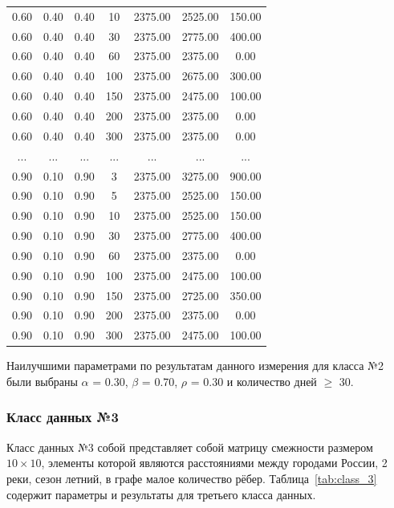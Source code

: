 \begin{table}[H]
\begin{tabular}{|c|c|c|c|c|c|c|}
  0.60 &   0.40 &   0.40 &     10 &    2375.00 &    2525.00 &     150.00  \\
  0.60 &   0.40 &   0.40 &     30 &    2375.00 &    2775.00 &     400.00  \\
  0.60 &   0.40 &   0.40 &     60 &    2375.00 &    2375.00 &       0.00  \\
  0.60 &   0.40 &   0.40 &    100 &    2375.00 &    2675.00 &     300.00  \\
  0.60 &   0.40 &   0.40 &    150 &    2375.00 &    2475.00 &     100.00  \\
  0.60 &   0.40 &   0.40 &    200 &    2375.00 &    2375.00 &       0.00  \\
  0.60 &   0.40 &   0.40 &    300 &    2375.00 &    2375.00 &       0.00  \\
    ... &   ... &   ... &    ... &    ... &    ... &      ...  \\
  0.90 &   0.10 &   0.90 &      3 &    2375.00 &    3275.00 &     900.00  \\
  0.90 &   0.10 &   0.90 &      5 &    2375.00 &    2525.00 &     150.00  \\
  0.90 &   0.10 &   0.90 &     10 &    2375.00 &    2525.00 &     150.00  \\
  0.90 &   0.10 &   0.90 &     30 &    2375.00 &    2775.00 &     400.00  \\
  0.90 &   0.10 &   0.90 &     60 &    2375.00 &    2375.00 &       0.00  \\
  0.90 &   0.10 &   0.90 &    100 &    2375.00 &    2475.00 &     100.00  \\
  0.90 &   0.10 &   0.90 &    150 &    2375.00 &    2725.00 &     350.00  \\
  0.90 &   0.10 &   0.90 &    200 &    2375.00 &    2375.00 &       0.00  \\
  0.90 &   0.10 &   0.90 &    300 &    2375.00 &    2475.00 &     100.00  \\
  \hline
    \end{tabular}
\end{table}

Наилучшими параметрами по результатам данного измерения для класса №2 были выбраны   $\alpha$ = 0.30, $\beta$ = 0.70, $\rho$ = 0.30 и количество дней $\geq$ 30.


\subsubsection{Класс данных №3}

\hspace{1.25cm}
Класс данных №3 собой представляет собой матрицу смежности размером $10 \times 10$, элементы которой являются расстояниями между городами России, 2 реки, сезон летний, в графе малое количество рёбер. Таблица~\ref{tab:class_3} содержит параметры и результаты для третьего класса данных.

